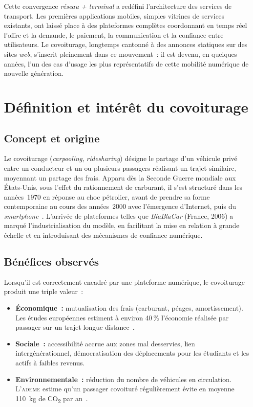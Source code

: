 \documentclass[12pt, a4paper, oneside]{report}
\begin{document}
Cette convergence \textit{réseau + terminal} a redéfini l'architecture des services de transport. Les premières applications mobiles, simples vitrines de services existants, ont laissé place à des plateformes complètes coordonnant en temps réel l'offre et la demande, le paiement, la communication et la confiance entre utilisateurs. Le covoiturage, longtemps cantonné à des annonces statiques sur des sites \textit{web}, s'inscrit pleinement dans ce mouvement~: il est devenu, en quelques années, l'un des cas d'usage les plus représentatifs de cette mobilité numérique de nouvelle génération.

\section{Définition et intérêt du covoiturage}
\label{sec:definition-covoiturage}

\subsection{Concept et origine}

Le covoiturage (\textit{carpooling}, \textit{ridesharing}) désigne le partage d'un véhicule privé entre un conducteur et un ou plusieurs passagers réalisant un trajet similaire, moyennant un partage des frais. Apparu dès la Seconde Guerre mondiale aux États-Unis, sous l'effet du rationnement de carburant, il s'est structuré dans les années~1970 en réponse au choc pétrolier, avant de prendre sa forme contemporaine au cours des années~2000 avec l'émergence d'Internet, puis du \textit{smartphone}~\cite{chan_carpooling_2012}. L'arrivée de plateformes telles que \textit{BlaBlaCar} (France, 2006) a marqué l'industrialisation du modèle, en facilitant la mise en relation à grande échelle et en introduisant des mécanismes de confiance numérique.

\subsection{Bénéfices observés}

Lorsqu'il est correctement encadré par une plateforme numérique, le covoiturage produit une triple valeur~:
\begin{itemize}
  \item \textbf{Économique~:} mutualisation des frais (carburant, péages, amortissement). Les études européennes estiment à environ 40\,\% l'économie réalisée par passager sur un trajet longue distance~\cite{blablacar_report_2023}.
  \item \textbf{Sociale~:} accessibilité accrue aux zones mal desservies, lien intergénérationnel, démocratisation des déplacements pour les étudiants et les actifs à faibles revenus.
  \item \textbf{Environnementale~:} réduction du nombre de véhicules en circulation. L'\textsc{ademe} estime qu'un passager covoituré régulièrement évite en moyenne 110~kg de CO\textsubscript{2} par an~\cite{ademe_2022}.
\end{itemize}
\end{document}
